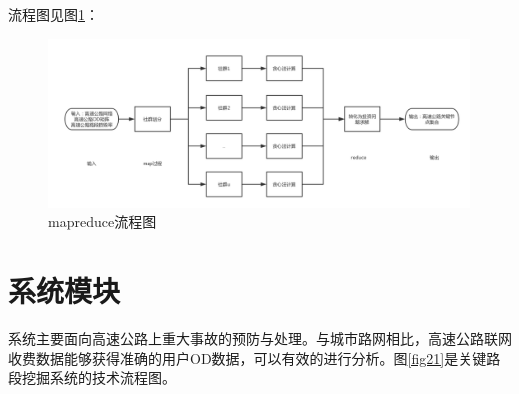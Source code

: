 		流程图见图\ref{mapreduce}：
		\begin{figure}[h]
		\centering
				\begin{minipage}{0.8\linewidth}
					\centering
					\includegraphics[width=4.4in]{picture/mapreduce}
					\caption{mapreduce流程图}
					\label{mapreduce}
				\end{minipage}%
		\end{figure}

	\section{系统模块}

		系统主要面向高速公路上重大事故的预防与处理。与城市路网相比，高速公路联网收费数据能够获得准确的用户OD数据，可以有效的进行分析。图\ref{fig21}是关键路段挖掘系统的技术流程图。

